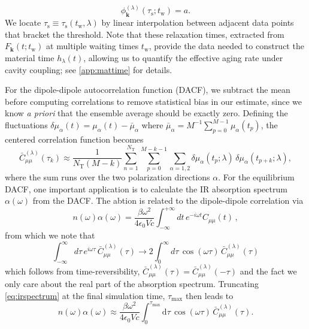 \begin{equation}
\phi_{\bm k}^{(\lambda)}(\tau_\mathrm{s};t_\mathrm{w}) = a.
\label{eq:threshold_criterion}
\end{equation}
We locate $\tau_\mathrm{s} \equiv \tau_\mathrm{s}(t_\mathrm{w},\lambda)$ by linear interpolation between adjacent data points that bracket the threshold. 
Note that these relaxation times, extracted from $F_{\bm k}(t;t_\mathrm{w})$ at multiple waiting times $t_\mathrm{w}$, provide the data needed to construct the material time $h_\lambda(t)$, allowing us to quantify the effective aging rate under cavity coupling; see \cref{app:mattime} for details. 


For the dipole-dipole autocorrelation function (DACF), we subtract the mean before computing correlations to remove statistical bias in our estimate, since we know \textit{a priori} that the ensemble average should be exactly zero. Defining the fluctuations $\delta \mu_\alpha(t) = \mu_\alpha(t) - \bar{\mu}_\alpha$ where $\bar{\mu}_\alpha = M^{-1}\sum_{p=0}^{M-1} \mu_\alpha(t_p)$, the centered correlation function becomes
\begin{equation}
\bar{C}_{\mu \mu}^{(\lambda)}(\tau_k) \approx \frac{1}{N_\mathrm{T}(M-k)} \sum_{n=1}^{N_\mathrm{T}} \sum_{p=0}^{M-k-1}  \sum_{\alpha =1,2} \delta \mu_\alpha(t_p;\lambda) \, \delta \mu_\alpha(t_{p+k};\lambda),
\end{equation}
where the sum runs over the two polarization directions $\alpha$. For the equilibrium DACF, one important application is to calculate the IR absorption spectrum $\alpha(\omega)$ from the DACF. The abtion is related to the dipole-dipole correlation via
\begin{equation}
n(\omega) \alpha(\omega) = \frac{\beta \omega^2}{4 \epsilon_0 V c} \int_{-\infty}^{+\infty} \!\!\!\! dt \, e^{-i \omega t} C_{\mu\mu}(t)  \,, \label{eq:irspectrum}
\end{equation}
from which we note that
\begin{equation}
\int_{-\infty}^{\infty} d\tau \, e^{i \omega \tau}\, \bar{C}_{\mu \mu}^{(\lambda)}(\tau)
\to 2 \int_{0}^{\infty} d\tau \, \cos(\omega \tau)\, \bar{C}_{\mu \mu}^{(\lambda)}(\tau)
\end{equation}
which follows from time-reversibility, $\bar{C}_{\mu \mu}^{(\lambda)}(\tau)=\bar{C}_{\mu \mu}^{(\lambda)}(-\tau)$ and the fact we only care about the real part of the absorption spectrum. Truncating \cref{eq:irspectrum} at the final simulation time, $\tau_{\max}$ then leads to
\begin{equation}
n(\omega) \alpha(\omega) \approx \frac{\beta \omega^{2}}{4 \epsilon_0 V c} \int_{0}^{\tau_{\max}} \!\!\!\!\!\mathrm{d}\tau\,\cos(\omega \tau)\,\bar{C}_{\mu \mu}^{(\lambda)}(\tau) .
\end{equation}
